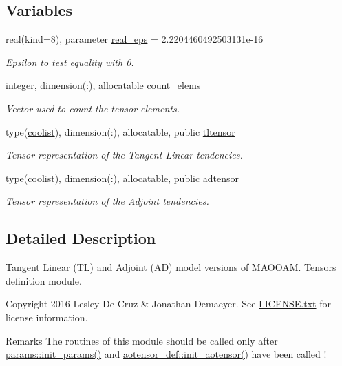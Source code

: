 \subsection*{Variables}
\begin{DoxyCompactItemize}
\item 
real(kind=8), parameter \hyperlink{namespacetl__ad__tensor_a05a4b79ccb098a47a400e175e12c1c6c}{real\+\_\+eps} = 2.\+2204460492503131e-\/16
\begin{DoxyCompactList}\small\item\em Epsilon to test equality with 0. \end{DoxyCompactList}\item 
integer, dimension(\+:), allocatable \hyperlink{namespacetl__ad__tensor_a8836f34c3a96c44c487c7910ab8c7507}{count\+\_\+elems}
\begin{DoxyCompactList}\small\item\em Vector used to count the tensor elements. \end{DoxyCompactList}\item 
type(\hyperlink{structtensor_1_1coolist}{coolist}), dimension(\+:), allocatable, public \hyperlink{namespacetl__ad__tensor_a6180cfcc4d4ad119ef93266ea955903c}{tltensor}
\begin{DoxyCompactList}\small\item\em Tensor representation of the Tangent Linear tendencies. \end{DoxyCompactList}\item 
type(\hyperlink{structtensor_1_1coolist}{coolist}), dimension(\+:), allocatable, public \hyperlink{namespacetl__ad__tensor_af0a4e6cdc6d653fa808eedaa7ce331de}{adtensor}
\begin{DoxyCompactList}\small\item\em Tensor representation of the Adjoint tendencies. \end{DoxyCompactList}\end{DoxyCompactItemize}


\subsection{Detailed Description}
Tangent Linear (TL) and Adjoint (AD) model versions of M\+A\+O\+O\+AM. Tensors definition module. 

\begin{DoxyCopyright}{Copyright}
2016 Lesley De Cruz \& Jonathan Demaeyer. See \hyperlink{LICENSE_8txt}{L\+I\+C\+E\+N\+S\+E.\+txt} for license information. 
\end{DoxyCopyright}
\begin{DoxyRemark}{Remarks}
The routines of this module should be called only after \hyperlink{namespaceparams_aa5d1f7f88b00cf3705691de2f6f92a08}{params\+::init\+\_\+params()} and \hyperlink{namespaceaotensor__def_ac583b298e9b68f84b0a22588d3b7dbcd}{aotensor\+\_\+def\+::init\+\_\+aotensor()} have been called ! 
\end{DoxyRemark}



